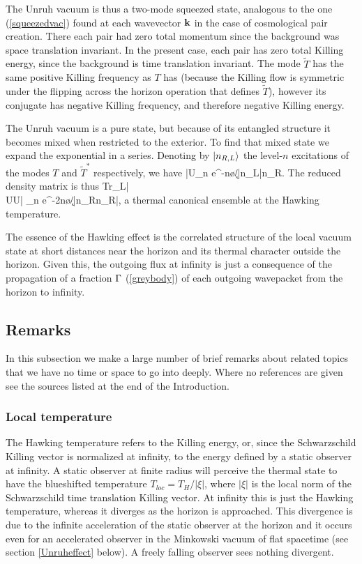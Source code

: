 \documentclass[12pt]{article}
\begin{document}
The Unruh vacuum is thus a two-mode squeezed
state, analogous to the one (\ref{squeezedvac}) 
found at each 
wavevector $\bf k$ in the case of cosmological 
pair creation. There each pair had zero total momentum
since the background was space translation invariant. In the
present case, each pair has zero total Killing energy,
since the background is time translation invariant. 
The mode $\widetilde{T}$ has the same positive Killing 
frequency as $T$ has (because the Killing 
flow is symmetric under the flipping across the horizon
operation that defines $\widetilde{T}$), 
however its conjugate has negative
Killing frequency, and therefore negative Killing energy.

The Unruh vacuum is a pure state, but because of
its entangled structure it becomes mixed 
when restricted to the exterior. To find that mixed state
we expand the exponential in a series.
Denoting by $|n_{R,L}\rangle$ the level-$n$ excitations 
of the modes $T$ and $\widetilde{T}^*$ respectively, we have
\beq
|U\ra\propto  \sum_n e^{-n\pi\o/\k}|n_L\ra|n_R\ra.
\label{U}
\eeq
The reduced density matrix is thus 
\beq
Tr_L|\\U\ra\la U| \propto \sum_n e^{-2n\pi\o/\k}|n_R\ra\la n_R|,
\label{Uright}
\eeq
a thermal canonical ensemble at the Hawking temperature.

The essence of the Hawking effect is 
the correlated structure of the local vacuum state at short distances near the horizon and its thermal character outside the horizon. Given this, the outgoing flux at infinity is just a consequence of the propagation of a fraction $\Gamma$ (\ref{greybody})
of each outgoing wavepacket from the horizon to infinity.

\subsection{Remarks}

In this subsection we make a large number of brief remarks
about related topics that we have no time
or space to go into deeply. Where no references are given see
the sources listed at the end of the Introduction.

\subsubsection{Local temperature} 
\label{localtemp}

The Hawking temperature refers to the Killing energy,
or, since the Schwarzschild Killing vector is normalized at 
infinity, to the energy defined by a static observer
at infinity. A static observer at finite
radius will perceive the thermal state to have the 
blueshifted temperature
$T_{loc}=T_H/|\xi|$, where $|\xi|$ is the local norm of the 
Schwarzschild time
translation Killing vector. At infinity this is 
just the Hawking temperature, whereas 
it diverges as the horizon is approached.  This divergence
is due to the infinite acceleration of the static observer at the horizon
and it occurs even for an accelerated observer
in the Minkowski vacuum of flat spacetime (see section
\ref{Unruheffect} below).
A freely falling observer sees nothing divergent.
\end{document}
